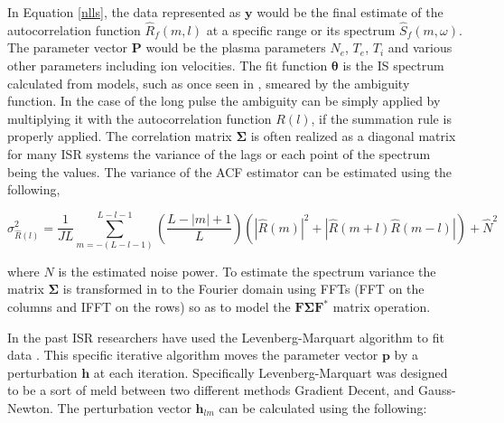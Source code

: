 \documentclass[draft,ras]{agutex}
\begin{document}
\begin{article}
In Equation \ref{nlls}, the data represented as $\mathbf{y}$ would be the final estimate of the autocorrelation function $\hat{R}_f(m,l)$ at a specific range or its spectrum $\hat{S}_f(m,\omega)$.  The parameter vector $\mathbf{P}$ would be the plasma parameters $N_e$, $T_e$, $T_i$ and various other parameters including ion velocities. The fit function $\bm{\theta}$ is the IS spectrum calculated from models, such as once seen in \citep{kudeki:milla:1}, smeared by the ambiguity function.  In the case of the long pulse the ambiguity can be simply applied by multiplying it with the autocorrelation function $R(l)$, if the summation rule is properly applied. The correlation matrix $\bm{\Sigma}$ is often realized as a diagonal matrix for many ISR systems the variance of the lags or each point of the spectrum being the values. The variance of the ACF estimator can be estimated using the following,

\begin{equation}
\label{eqn:acfvar}
\sigma_{\hat{R}(l)}^2=\frac{1}{JL}\displaystyle \sum_{m=-(L-l-1)}^{L-l-1}\left(\frac{L-|m|+1}{L}\right)\left(|\hat{R}(m)|^2 +|\hat{R}(m+l)\hat{R}(m-l)|\right) + \hat{N}^2
\end{equation}

\noindent where $N$ is the estimated noise power. To estimate the spectrum variance the matrix $\bm{\Sigma}$ is transformed in to the Fourier domain using FFTs (FFT on the columns and IFFT on the rows) so as to model the $\mathbf{F}\bm{\Sigma} \mathbf{F}^*$ matrix operation. 






In the past ISR researchers have used the Levenberg-Marquart algorithm to fit data \citep{nikoukar2008}.  This specific iterative algorithm moves the parameter vector $\mathbf{p}$ by a perturbation $\mathbf{h}$ at each iteration\citep{gavin:2013}.  Specifically Levenberg-Marquart was designed to be a sort of meld between two different methods Gradient Decent, and Gauss-Newton.  The perturbation vector $\mathbf{h}_{lm}$ can be calculated using the following:


\end{article}
\end{document}
